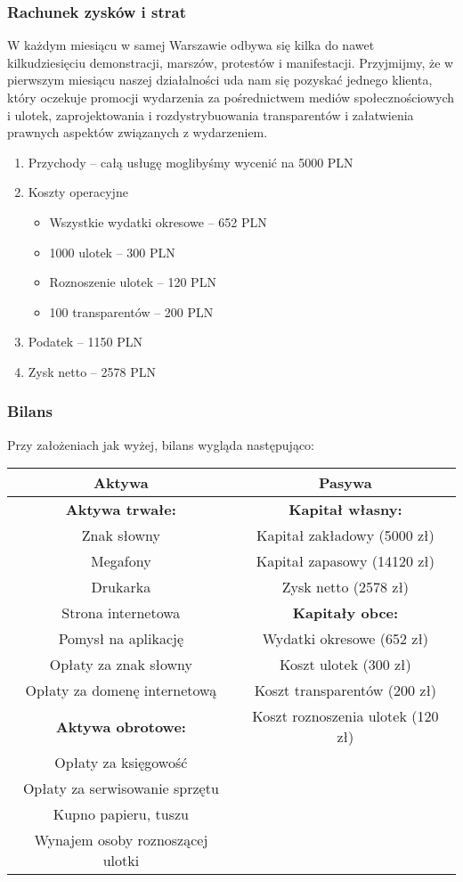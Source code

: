 \documentclass{article}
\begin{document}
\subsubsection{Rachunek zysków i strat}
W każdym miesiącu w samej Warszawie odbywa się kilka do nawet kilkudziesięciu demonstracji, marszów, protestów i manifestacji. Przyjmijmy, że w pierwszym miesiącu naszej działalności uda nam się pozyskać jednego klienta, który oczekuje promocji wydarzenia za pośrednictwem mediów społecznościowych i ulotek, zaprojektowania i rozdystrybuowania transparentów i załatwienia prawnych aspektów związanych z wydarzeniem.

\begin{enumerate}
\item Przychody -- całą usługę moglibyśmy wycenić na 5000 PLN
\item Koszty operacyjne
\begin{itemize}
\item Wszystkie wydatki okresowe -- 652 PLN
\item 1000 ulotek -- 300 PLN
\item Roznoszenie ulotek -- 120 PLN
\item 100 transparentów -- 200 PLN
\end{itemize}
\item Podatek -- 1150 PLN
\item Zysk netto -- 2578 PLN
\end{enumerate}

\subsubsection{Bilans}
Przy założeniach jak wyżej, bilans wygląda następująco:
\begin{table}[!ht]
\label{tableb}
\vspace{0.3cm}
\hspace{-2cm}
\centering
\begin{tabular}{|c|c|}
\hline
\textbf{Aktywa} & \textbf{Pasywa} \\
\hline
\textbf{Aktywa trwałe:} & \textbf{Kapitał własny:} \\
Znak słowny & Kapitał zakładowy (5000 zł) \\
Megafony & Kapitał zapasowy (14120 zł) \\
Drukarka	& Zysk netto (2578 zł) \\
Strona internetowa & \textbf{Kapitały obce:} \\
Pomysł na aplikację & Wydatki okresowe (652 zł) \\
Opłaty za znak słowny  & Koszt ulotek (300 zł) \\
Opłaty za domenę internetową & Koszt transparentów (200 zł) \\
\textbf{Aktywa obrotowe:} & Koszt roznoszenia ulotek (120 zł) \\
Opłaty za księgowość & \\
Opłaty za serwisowanie sprzętu & \\
Kupno papieru, tuszu & \\
Wynajem osoby roznoszącej ulotki & \\
\hline
\end{tabular}
\end{table}
\end{document}
